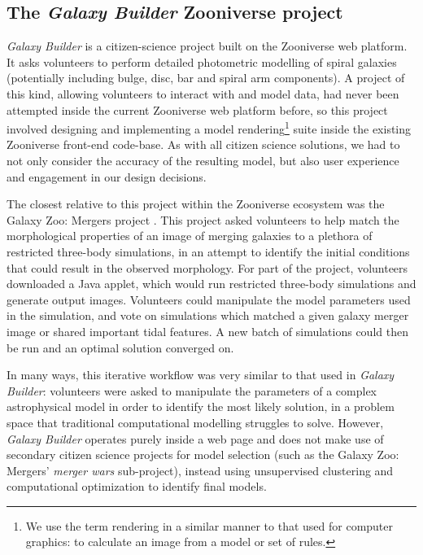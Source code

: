 \documentclass[../main.tex]{subfiles}
\begin{document}
\label{sec:method}

\subsection{The \textit{Galaxy Builder} Zooniverse project}

\textit{Galaxy Builder} is a citizen-science project built on the Zooniverse web platform. It asks volunteers to perform detailed photometric modelling of spiral galaxies (potentially including bulge, disc, bar and spiral arm components). A project of this kind, allowing volunteers to interact with and model data, had never been attempted inside the current Zooniverse web platform before, so this project involved designing and implementing a model rendering\footnote{We use the term rendering in a similar manner to that used for computer graphics: to calculate an image from a model or set of rules.} suite inside the existing Zooniverse front-end code-base. As with all citizen science solutions, we had to not only consider the accuracy of the resulting model, but also user experience and engagement in our design decisions.

The closest relative to this project within the Zooniverse ecosystem was the Galaxy Zoo: Mergers project \citep{Holincheck2016:1604.00435v1}. This project asked volunteers to help match the morphological properties of an image of merging galaxies to a plethora of restricted three-body simulations, in an attempt to identify the initial conditions that could result in the observed morphology. For part of the project, volunteers downloaded a Java applet, which would run restricted three-body simulations and generate output images. Volunteers could manipulate the model parameters used in the simulation, and vote on simulations which matched a given galaxy merger image or shared important tidal features. A new batch of simulations could then be run and an optimal solution converged on.

In many ways, this iterative workflow was very similar to that used in \textit{Galaxy Builder}: volunteers were asked to manipulate the parameters of a complex astrophysical model in order to identify the most likely solution, in a problem space that traditional computational modelling struggles to solve. However, \textit{Galaxy Builder} operates purely inside a web page and does not make use of secondary citizen science projects for model selection (such as the Galaxy Zoo: Mergers' \textit{merger wars} sub-project), instead using unsupervised clustering and computational optimization to identify final models.
\end{document}
